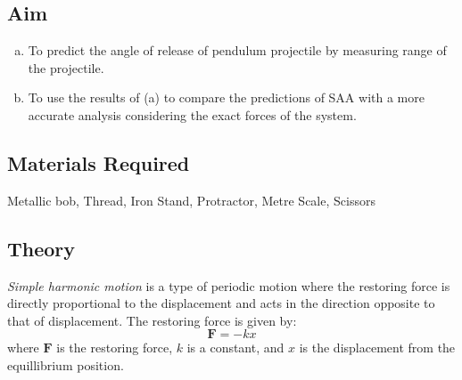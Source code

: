 \subsection{Aim}
\begin{enumerate}[(a)]
\item To predict the angle of release of pendulum projectile by measuring range of the projectile.
\item To use the results of (a) to compare the predictions of SAA with a more accurate analysis considering the exact forces of the system. 
\end{enumerate}
\subsection{Materials Required}
Metallic bob, Thread, Iron Stand, Protractor, Metre Scale, Scissors
\subsection{Theory}
\emph{Simple harmonic motion} is a type of periodic motion where the restoring force is directly proportional to the displacement and acts in the direction opposite to that of displacement. The restoring force is given by:
\[
  \mathbf{F}=-kx
\]
where $\mathbf{F}$ is the restoring force, $k$ is a constant, and $x$ is the displacement from the equillibrium position.

